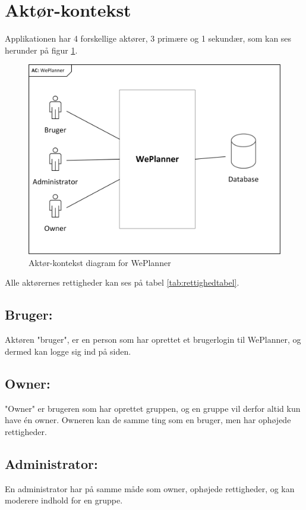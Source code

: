 \section{Aktør-kontekst}
Applikationen har 4 forskellige aktører, 3 primære og 1 sekundær, som kan ses herunder på figur \ref{fig:aktor_konteks}.
\begin{figure}[H]
  \includegraphics[width=\linewidth]{01_Billeder/05_Kravspek/Aktor-kontekst_diagram.png}
  \caption{Aktør-kontekst diagram for WePlanner}
  \label{fig:aktor_konteks}
\end{figure}
Alle aktørernes rettigheder kan ses på tabel \ref{tab:rettighedtabel}.
\subsection{Bruger:}
Aktøren "bruger", er en person som har oprettet et brugerlogin til WePlanner, og dermed kan logge sig ind på siden.

\subsection{Owner:}
"Owner" er brugeren som har oprettet gruppen, og en gruppe vil derfor altid kun have én owner. Owneren kan de samme ting som en bruger, men har ophøjede rettigheder. 

\subsection{Administrator:}
En administrator har på samme måde som owner, ophøjede rettigheder, og kan moderere indhold for en gruppe. 

